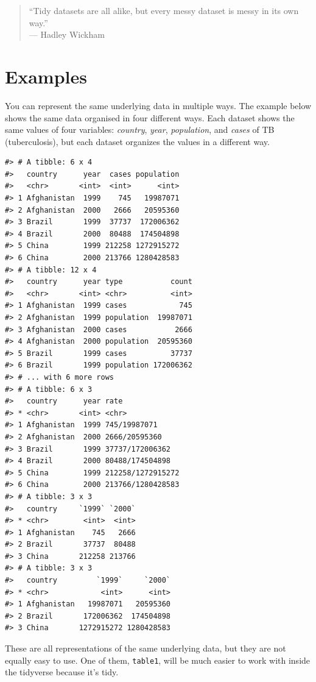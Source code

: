 \documentclass[
]{book}
\begin{document}
\begin{quote}
``Tidy datasets are all alike, but every messy dataset is messy in its own way.''\\
--- Hadley Wickham
\end{quote}

\hypertarget{examples}{%
\section{Examples}\label{examples}}

You can represent the same underlying data in multiple ways.
The example below shows the same data organised in four different ways.
Each dataset shows the same values of four variables: \emph{country}, \emph{year}, \emph{population}, and \emph{cases} of TB (tuberculosis), but each dataset organizes the values in a different way.

\begin{verbatim}
#> # A tibble: 6 x 4
#>   country      year  cases population
#>   <chr>       <int>  <int>      <int>
#> 1 Afghanistan  1999    745   19987071
#> 2 Afghanistan  2000   2666   20595360
#> 3 Brazil       1999  37737  172006362
#> 4 Brazil       2000  80488  174504898
#> 5 China        1999 212258 1272915272
#> 6 China        2000 213766 1280428583
#> # A tibble: 12 x 4
#>   country      year type           count
#>   <chr>       <int> <chr>          <int>
#> 1 Afghanistan  1999 cases            745
#> 2 Afghanistan  1999 population  19987071
#> 3 Afghanistan  2000 cases           2666
#> 4 Afghanistan  2000 population  20595360
#> 5 Brazil       1999 cases          37737
#> 6 Brazil       1999 population 172006362
#> # ... with 6 more rows
#> # A tibble: 6 x 3
#>   country      year rate             
#> * <chr>       <int> <chr>            
#> 1 Afghanistan  1999 745/19987071     
#> 2 Afghanistan  2000 2666/20595360    
#> 3 Brazil       1999 37737/172006362  
#> 4 Brazil       2000 80488/174504898  
#> 5 China        1999 212258/1272915272
#> 6 China        2000 213766/1280428583
#> # A tibble: 3 x 3
#>   country     `1999` `2000`
#> * <chr>        <int>  <int>
#> 1 Afghanistan    745   2666
#> 2 Brazil       37737  80488
#> 3 China       212258 213766
#> # A tibble: 3 x 3
#>   country         `1999`     `2000`
#> * <chr>            <int>      <int>
#> 1 Afghanistan   19987071   20595360
#> 2 Brazil       172006362  174504898
#> 3 China       1272915272 1280428583
\end{verbatim}

These are all representations of the same underlying data, but they are not equally easy to use.
One of them, \texttt{table1}, will be much easier to work with inside the tidyverse because it's tidy.
\end{document}
